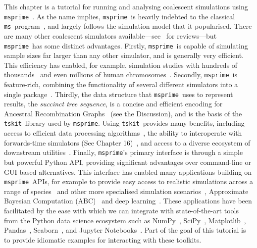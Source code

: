 \documentclass[graybox]{svmult}
\newcommand{\msprime}[0]{\texttt{msprime}}
\newcommand{\tskit}[0]{\texttt{tskit}}
\newcommand{\ms}[0]{\texttt{ms}}
\begin{document}
This chapter is a tutorial for running and analysing coalescent simulations
using \msprime~\citep{kelleher2016efficient,baumdicker2022efficient}.
As the name implies, \msprime\ is heavily indebted to the classical
\ms\ program~\citep{hudson2002generating}, and largely follows the
simulation model that it popularised.
There are many other coalescent simulators available---see~\citep{carvajal2008simulation,liu2008survey,arenas2012simulation,
yuan2012overview,hoban2012computer} for reviews---but \msprime\ has
some distinct advantages.
Firstly, \msprime\ is capable of simulating
sample sizes far larger than any other simulator, and is generally
very efficient. This efficiency has enabled, for example,
simulation
studies with hundreds of
thousands~\citep{martin2017human,martin2020correction,ragsdale2020lessons}
and even millions of human chromosomes~\citep{andersontrocme2023genes}.
Secondly, \msprime\ is feature-rich, combining the functionality of
several different simulators into a single
package~\citep{baumdicker2022efficient}.
Thirdly, the data structure that \msprime\ uses
to represent results,
the \emph{succinct tree sequence},
is a concise and efficient encoding 
for Ancestral Recombination Graphs~\citep{wong2024general}
(see the Discussion),
and is the basis of the \tskit\ library used by \msprime.
Using \tskit\ provides many benefits, including access to efficient
data processing algorithms~\citep{ralph2020efficiently,lehmann2025on},
the ability to interoperate with forwards-time
simulators (See Chapter 16)~\citep{kelleher2018efficient,haller2018tree},
and access to a diverse ecosystem of downstream
utilities~\cite{fan2022genealogical,nowbandegani2023extremely,tsambos2023link,
tagami2024tstrait,fritze2024forest}.
Finally, \msprime's primary interface is through a simple but powerful Python
API, providing significant advantages over command-line or GUI based alternatives.
This interface has enabled many applications building
on \msprime\ APIs, for example to provide easy access to
realistic simulations across a range of
species~\citep{adrion2020stdpopsim,lauterbur2023expanding,gower2025accessible}
and other more specialised simulation
scenarios~\citep{mckenzie2020ipcoal,rivera2021simulation,petrslendr2023,laetsch2023demographically},
Approximate Bayesian Computation (ABC)~\citep{huang2025estimating}
and deep learning~\cite{korfmann2023deep}.
These applications have been facilitated by the ease with
which we can integrate with state-of-the-art tools from the
Python data science ecosystem such as
NumPy~\citep{walt2011numpy,harris2020array},
SciPy~\citep{jones-2018-scipy},
Matplotlib~\citep{hunter2007matplotlib}, Pandas~\citep{mckinney2010data},
Seaborn~\citep{michael_waskom_2017_883859}, and
Jupyter Notebooks~\citep{perez2007ipython}. Part of the goal
of this tutorial is to provide idiomatic examples for interacting
with these toolkits.
\end{document}
